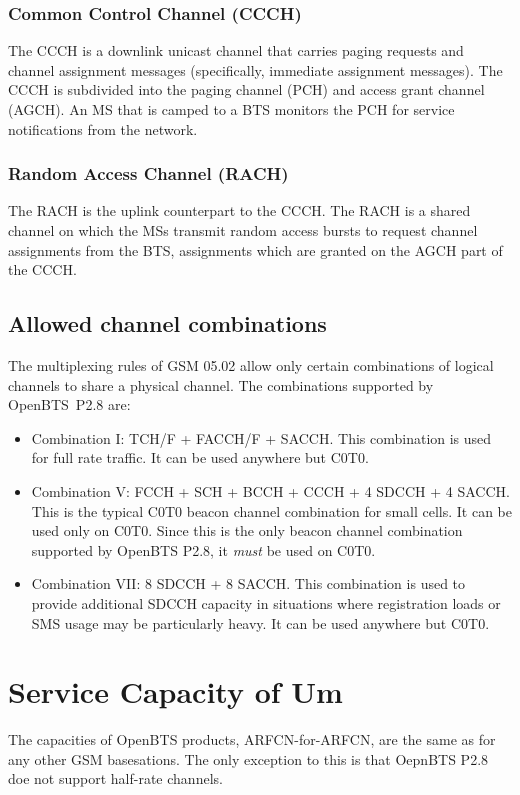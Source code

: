 \documentclass[11pt,openany]{book}
\begin{document}
\subsubsection{Common Control Channel (CCCH)}
The CCCH is a downlink unicast channel that carries paging requests and channel assignment messages (specifically, immediate assignment messages). The CCCH is subdivided into the paging channel (PCH) and access grant channel (AGCH). An MS that is camped to a BTS monitors the PCH for service notifications from the network.

\subsubsection{Random Access Channel (RACH)}
The RACH is the uplink counterpart to the CCCH. The RACH is a shared channel on which the MSs transmit random access bursts to request channel assignments from the BTS, assignments which are granted on the AGCH part of the CCCH.

\subsection{Allowed channel combinations}
The multiplexing rules of GSM 05.02 allow only certain combinations of logical channels to share a physical channel. The combinations supported by OpenBTS~P2.8 are:
\begin{itemize}
	\item Combination I: TCH/F + FACCH/F + SACCH. This combination is used for full rate traffic. It can be used anywhere but C0T0.
	\item Combination V: FCCH + SCH + BCCH + CCCH + 4 SDCCH + 4 SACCH. This is the typical C0T0 beacon channel combination for small cells. It can be used only on C0T0.  Since this is the only beacon channel combination supported by OpenBTS P2.8, it \emph{must} be used on C0T0.
	\item Combination VII: 8 SDCCH + 8 SACCH. This combination is used to provide additional SDCCH capacity in situations where registration loads or SMS usage may be particularly heavy. It can be used anywhere but C0T0.
\end{itemize}





\section{Service Capacity of Um}
The capacities of OpenBTS products, ARFCN-for-ARFCN, are the same as for any other GSM basesations. The only exception to this is that OepnBTS P2.8 doe not support half-rate channels.
\end{document}
